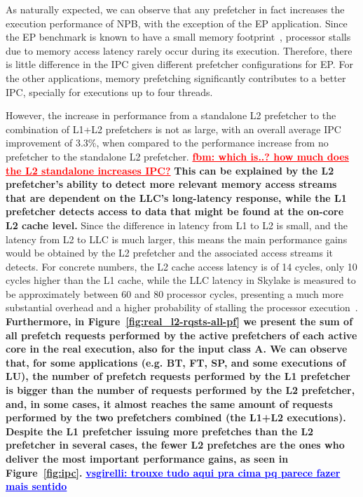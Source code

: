 \documentclass[AMA,final,STIX1COL]{WileyNJD-v2}
\newcommand{\vsg}[1]{\textcolor{blue}{\bfseries \ul{vsgirelli: #1} }\vspace{0.2cm}}
\newcommand{\fbm}[1]{\textcolor{red}{\bfseries \ul{fbm: #1} }\vspace{0.2cm}}
\begin{document}
As naturally expected, we can observe that any prefetcher in fact increases the execution performance of NPB, with the exception of the EP application. 
Since the EP benchmark is known to have a small memory footprint~\cite{jin1999openmp}, processor stalls due to memory access latency rarely occur during its execution. 
Therefore, there is little difference in the IPC given different prefetcher configurations for EP. 
For the other applications, memory prefetching significantly contributes to a better IPC, specially for executions up to four threads.


However, the increase in performance from a standalone L2 prefetcher to the combination of L1+L2 prefetchers is not as large, with an overall average IPC improvement of 3.3\%, when compared to the performance increase from no prefetcher to the standalone L2 prefetcher. \fbm{which is..? how much does the L2 standalone increases IPC?}
\textbf{This can be explained by the L2 prefetcher's ability to detect more relevant memory access streams that are dependent on the LLC's long-latency response, while the L1 prefetcher detects access to data that might be found at the on-core L2 cache level.}
Since the difference in latency from L1 to L2 is small, and the latency from L2 to LLC is much larger, this means the main performance gains would be obtained by the L2 prefetcher and the associated access streams it detects.
For concrete numbers, the L2 cache access latency is of 14 cycles, only 10 cycles higher than the L1 cache, while the LLC latency in Skylake is measured to be approximately between 60 and 80 processor cycles, presenting a much more substantial overhead and a higher probability of stalling the processor execution~\cite{alves2015sinuca}. 
\textbf{Furthermore, in Figure~\ref{fig:real_l2-rqsts-all-pf} we present the sum of all prefetch requests performed by the active prefetchers of each active core in the real execution, also for the input class A.
We can observe that, for some applications (e.g. BT, FT, SP, and some executions of LU), the number of prefetch requests performed by the L1 prefetcher is bigger than the number of requests performed by the L2 prefetcher, and, in some cases, it almost reaches the same amount of requests performed by the two prefetchers combined (the L1+L2 executions).
Despite the L1 prefetcher issuing more prefetches than the L2 prefetcher in several cases, the fewer L2 prefetches are the ones who deliver the most important performance gains, as seen in Figure~\ref{fig:ipc}.}
\vsg{trouxe tudo aqui pra cima pq parece fazer mais sentido}
\end{document}
